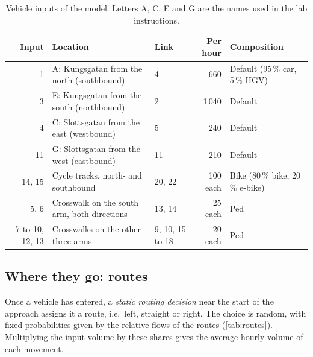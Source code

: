 \documentclass[11pt,a4paper]{article}
\begin{document}
\begin{table}[!htb]
\centering
\caption[Vehicle inputs]{Vehicle inputs of the model. Letters A, C, E and G are the names used in
the lab instructions.}
\label{tab:inputs}
\small
\begin{tabularx}{\textwidth}{r>{\raggedright\arraybackslash}Xlr>{\raggedright\arraybackslash}p{3.4cm}}
\toprule
\textbf{Input} & \textbf{Location} & \textbf{Link} & \textbf{Per hour} & \textbf{Composition}\\
\midrule
1  & A: Kungsgatan from the north (southbound) & 4  & 660   & Default (95\,\% car, 5\,\% HGV)\\
3  & E: Kungsgatan from the south (northbound) & 2  & 1\,040 & Default\\
4  & C: Slottsgatan from the east (westbound)  & 5  & 240   & Default\\
11 & G: Slottsgatan from the west (eastbound)  & 11 & 210   & Default\\
14, 15 & Cycle tracks, north- and southbound   & 20, 22 & 100 each & Bike (80\,\% bike, 20\,\% e-bike)\\
5, 6   & Crosswalk on the south arm, both directions & 13, 14 & 25 each & Ped\\
7 to 10, 12, 13 & Crosswalks on the other three arms & 9, 10, 15 to 18 & 20 each & Ped\\
\bottomrule
\end{tabularx}
\end{table}

\subsection{Where they go: routes}

Once a vehicle has entered, a \emph{static routing decision} near the start of the approach assigns
it a route, i.e.\ left, straight or right. The choice is random, with fixed probabilities given by
the relative flows of the routes (\cref{tab:routes}). Multiplying the input volume by these shares
gives the average hourly volume of each movement.
\end{document}
